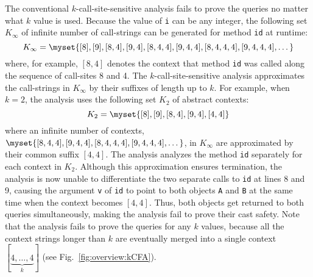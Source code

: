 The conventional $k$-call-site-sensitive analysis fails to prove the queries no matter what $k$ value is used.
Because the value of \texttt{i} can be any integer, the following set $K_{\infty}$ of infinite number of call-strings can be generated for method \texttt{id} at runtime:
\[
K_{\infty} = \myset{[8], [9], [8,4], [9,4], [8,4,4], [9,4,4], [8,4,4,4], [9,4,4,4], \dots}
\]
where, for example, $[8,4]$ denotes the context that method \texttt{id} was called along the sequence of
call-sites 8 and 4.
 The $k$-call-site-sensitive analysis approximates the call-strings in $K_{\infty}$ by their suffixes of length up to $k$. For example, when $k=2$, the analysis uses the following set $K_2$ of abstract contexts:
\[
K_2 = \myset{[8], [9], [8,4], [9,4], [4,4]}
\]
where an infinite number of contexts, $\myset{[8,4,4], [9,4,4], [8,4,4,4], [9,4,4,4],\dots}$, in $K_{\infty}$ are approximated by their common suffix $[4,4]$. The analysis analyzes the method \texttt{id} separately for each context in $K_2$. %
Although this approximation ensures termination, the analysis is now unable to differentiate the two separate calls to \texttt{id} at lines 8 and 9, causing the argument {\tt v} of {\tt id} to point to both objects {\tt A} and {\tt B} at the same time when the context becomes $[4,4]$. Thus, both objects get returned to both queries simultaneously, making the analysis fail to prove their cast safety.
Note that the analysis fails to prove the queries for any $k$ values, because all the context strings longer than $k$ are eventually
merged into a single context $[\underbrace{4,\dots,4}_{k}]$ (see Fig.~\ref{fig:overview:kCFA}).
	

